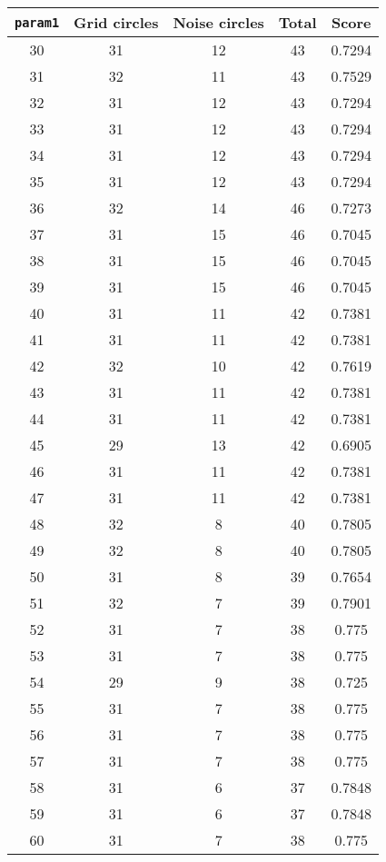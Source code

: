 \documentclass[letterpaper, 12pt]{article}
\begin{document}
\begin{longtable}{|c|c|c|c|c|}
\hline
\textbf{\texttt{param1}} & \textbf{Grid circles} & \textbf{Noise circles} & \textbf{Total} & \textbf{Score} \\
\hline
30 & 31 & 12 & 43 & 0.7294 \\
\hline
31 & 32 & 11 & 43 & 0.7529 \\
\hline
32 & 31 & 12 & 43 & 0.7294 \\
\hline
33 & 31 & 12 & 43 & 0.7294 \\
\hline
34 & 31 & 12 & 43 & 0.7294 \\
\hline
35 & 31 & 12 & 43 & 0.7294 \\
\hline
36 & 32 & 14 & 46 & 0.7273 \\
\hline
37 & 31 & 15 & 46 & 0.7045 \\
\hline
38 & 31 & 15 & 46 & 0.7045 \\
\hline
39 & 31 & 15 & 46 & 0.7045 \\
\hline
40 & 31 & 11 & 42 & 0.7381 \\
\hline
41 & 31 & 11 & 42 & 0.7381 \\
\hline
42 & 32 & 10 & 42 & 0.7619 \\
\hline
43 & 31 & 11 & 42 & 0.7381 \\
\hline
44 & 31 & 11 & 42 & 0.7381 \\
\hline
45 & 29 & 13 & 42 & 0.6905 \\
\hline
46 & 31 & 11 & 42 & 0.7381 \\
\hline
47 & 31 & 11 & 42 & 0.7381 \\
\hline
48 & 32 & 8 & 40 & 0.7805 \\
\hline
49 & 32 & 8 & 40 & 0.7805 \\
\hline
50 & 31 & 8 & 39 & 0.7654 \\
\hline
51 & 32 & 7 & 39 & 0.7901 \\
\hline
52 & 31 & 7 & 38 & 0.775 \\
\hline
53 & 31 & 7 & 38 & 0.775 \\
\hline
54 & 29 & 9 & 38 & 0.725 \\
\hline
55 & 31 & 7 & 38 & 0.775 \\
\hline
56 & 31 & 7 & 38 & 0.775 \\
\hline
57 & 31 & 7 & 38 & 0.775 \\
\hline
58 & 31 & 6 & 37 & 0.7848 \\
\hline
59 & 31 & 6 & 37 & 0.7848 \\
\hline
60 & 31 & 7 & 38 & 0.775 \\
\hline

\end{longtable}
\end{document}

